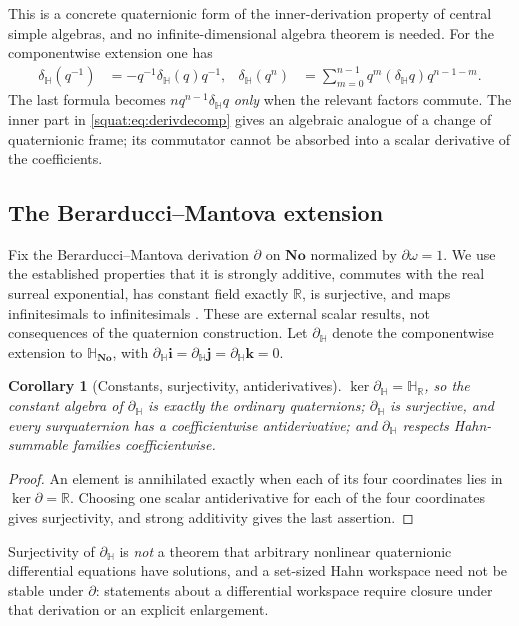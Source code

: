 \documentclass[11pt,letterpaper]{article}
\numberwithin{equation}{section}
\newtheorem{corollary}[corollary]{Corollary}
\theoremstyle{definition}
\theoremstyle{remark}
\newcommand{\No}{\mathbf{No}}
\newcommand{\SQ}{\mathbb H_{\No}}
\newcommand{\HR}{\mathbb H_{\mathbb R}}
\newcommand{\R}{\mathbb R}
\newcommand{\ii}{\mathbf i}
\newcommand{\jj}{\mathbf j}
\newcommand{\kk}{\mathbf k}
\newcommand{\dH}{\partial_{\mathbb H}}
\newcommand{\delH}{\delta_{\mathbb H}}
\begin{document}
This is a concrete quaternionic form of the inner-derivation property of central simple
algebras, and no infinite-dimensional algebra theorem is needed. For the componentwise
extension one has
\begin{align}\label{squat:eq:derivformulas}
 \delH(q^{-1})&=-q^{-1}\delH(q)q^{-1},
 &\delH(q^n)&=\sum_{m=0}^{n-1}q^m(\delH q)q^{n-1-m}.
\end{align}
The last formula becomes $nq^{n-1}\delH q$ \emph{only} when the relevant factors commute.
The inner part in \cref{squat:eq:derivdecomp} gives an algebraic analogue of a change of
quaternionic frame; its commutator cannot be absorbed into a scalar derivative of the
coefficients.

\subsection{The Berarducci--Mantova extension}\label{squat:sub:bm}
Fix the Berarducci--Mantova derivation $\partial$ on $\No$ normalized by
$\partial\omega=1$. We use the established properties that it is strongly additive,
commutes with the real surreal exponential, has constant field exactly $\R$, is
surjective, and maps infinitesimals to infinitesimals \cite[Theorems A and B]{BM}. These
are external scalar results, not consequences of the quaternion construction. Let $\dH$
denote the componentwise extension to $\SQ$, with $\dH\ii=\dH\jj=\dH\kk=0$.

\begin{corollary}[Constants, surjectivity, antiderivatives]\label{squat:cor:bmconstants}
$\ker\dH=\HR$, so the constant algebra of $\dH$ is exactly the ordinary quaternions;
$\dH$ is surjective, and every surquaternion has a coefficientwise antiderivative;
and $\dH$ respects Hahn-summable families coefficientwise.
\end{corollary}
\begin{proof}
An element is annihilated exactly when each of its four coordinates lies in
$\ker\partial=\R$. Choosing one scalar antiderivative for each of the four coordinates
gives surjectivity, and strong additivity gives the last assertion.
\end{proof}

Surjectivity of $\dH$ is \emph{not} a theorem that arbitrary nonlinear quaternionic
differential equations have solutions, and a set-sized Hahn workspace need not be stable
under $\partial$: statements about a differential workspace require closure under that
derivation or an explicit enlargement.
\end{document}
